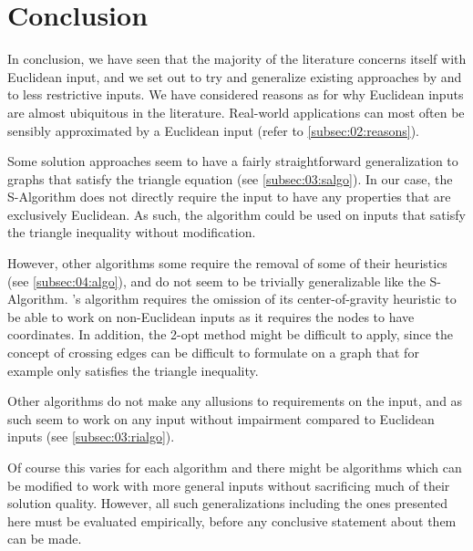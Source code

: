 \section{Conclusion}

In conclusion, we have seen that the majority of the literature concerns itself with Euclidean input,
and we set out to try and generalize existing approaches by \citeauthor{tsiligiridis_heuristic_1984} and \citeauthor{szwarc_novel_2022} to less restrictive inputs.
We have considered reasons as for why Euclidean inputs are almost ubiquitous in the literature.
Real-world applications can most often be sensibly approximated by a Euclidean input (refer to \cref{subsec:02:reasons}).

Some solution approaches seem to have a fairly straightforward generalization to graphs that satisfy the triangle equation (see \cref{subsec:03:salgo}).
In our case, the S-Algorithm does not directly require the input to have any properties that are exclusively Euclidean.
As such, the algorithm could be used on inputs that satisfy the triangle inequality without modification.

However, other algorithms some require the removal of some of their heuristics (see \cref{subsec:04:algo}),
and do not seem to be trivially generalizable like the S-Algorithm.
\citeauthor{szwarc_novel_2022}'s algorithm requires the omission of its center-of-gravity heuristic to be able to work on non-Euclidean inputs as it requires the nodes to have coordinates.
In addition, the 2-opt method might be difficult to apply, since the concept of crossing edges can be difficult to formulate on a graph that for example only satisfies the triangle inequality.

Other algorithms do not make any allusions to requirements on the input, and as such seem to work on any input without impairment compared to Euclidean inputs (see \cref{subsec:03:rialgo}).

Of course this varies for each algorithm and there might be algorithms which can be modified to work with more general inputs without sacrificing much of their solution quality.
However, all such generalizations including the ones presented here must be evaluated empirically, before any conclusive statement about them can be made.

